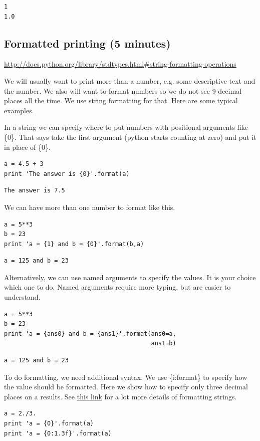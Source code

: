 \documentclass[11pt]{article}
\begin{document}
\begin{verbatim}
1
1.0
\end{verbatim}


\subsection{Formatted printing (5 minutes)}
\label{sec-3-2}
\url{http://docs.python.org/library/stdtypes.html#string-formatting-operations}

We will usually want to print more than a number, e.g. some descriptive text and the number. We also will want to format numbers so we do not see 9 decimal places all the time. We use string formatting for that. Here are some typical examples.

In a string we can specify where to put numbers with positional arguments like \{0\}. That says take the first argument (python starts counting at zero) and put it in place of \{0\}.

\begin{verbatim}
a = 4.5 + 3
print 'The answer is {0}'.format(a)
\end{verbatim}

\begin{verbatim}
The answer is 7.5
\end{verbatim}


We can have more than one number to format like this.
\begin{verbatim}
a = 5**3
b = 23
print 'a = {1} and b = {0}'.format(b,a)
\end{verbatim}

\begin{verbatim}
a = 125 and b = 23
\end{verbatim}

Alternatively, we can use named arguments to specify the values. It is your choice which one to do. Named arguments require more typing, but are easier to understand.
\begin{verbatim}
a = 5**3
b = 23
print 'a = {ans0} and b = {ans1}'.format(ans0=a,
                                         ans1=b)
\end{verbatim}

\begin{verbatim}
a = 125 and b = 23
\end{verbatim}

To do formatting, we need additional syntax. We use \{i:format\} to specify how the value should be formatted. Here we show how to specify only three decimal places on a results. See \href{http://docs.python.org/library/stdtypes.html#string-formatting-operations}{this link} for a lot more details of formatting strings.
\begin{verbatim}
a = 2./3.
print 'a = {0}'.format(a)
print 'a = {0:1.3f}'.format(a)
\end{verbatim}
\end{document}

